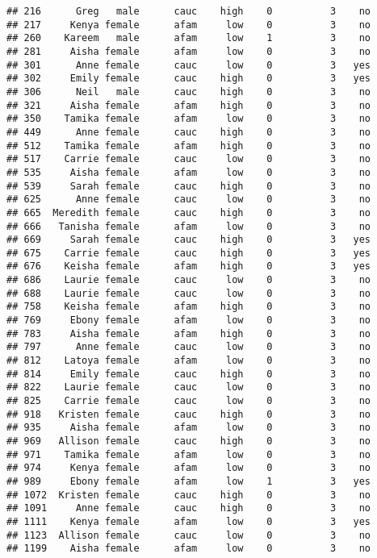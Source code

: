 \documentclass[
]{article}
\begin{document}
\begin{verbatim}
## 216      Greg   male      cauc    high    0          3    no
## 217     Kenya female      afam     low    0          3    no
## 260    Kareem   male      afam     low    1          3    no
## 281     Aisha female      afam     low    0          3    no
## 301      Anne female      cauc     low    0          3   yes
## 302     Emily female      cauc    high    0          3   yes
## 306      Neil   male      cauc    high    0          3    no
## 321     Aisha female      afam    high    0          3    no
## 350    Tamika female      afam     low    0          3    no
## 449      Anne female      cauc    high    0          3    no
## 512    Tamika female      afam    high    0          3    no
## 517    Carrie female      cauc     low    0          3    no
## 535     Aisha female      afam     low    0          3    no
## 539     Sarah female      cauc    high    0          3    no
## 625      Anne female      cauc     low    0          3    no
## 665  Meredith female      cauc    high    0          3    no
## 666   Tanisha female      afam     low    0          3    no
## 669     Sarah female      cauc    high    0          3   yes
## 675    Carrie female      cauc    high    0          3   yes
## 676    Keisha female      afam    high    0          3   yes
## 686    Laurie female      cauc     low    0          3    no
## 688    Laurie female      cauc     low    0          3    no
## 758    Keisha female      afam    high    0          3    no
## 769     Ebony female      afam     low    0          3    no
## 783     Aisha female      afam    high    0          3    no
## 797      Anne female      cauc     low    0          3    no
## 812    Latoya female      afam     low    0          3    no
## 814     Emily female      cauc    high    0          3    no
## 822    Laurie female      cauc     low    0          3    no
## 825    Carrie female      cauc     low    0          3    no
## 918   Kristen female      cauc    high    0          3    no
## 935     Aisha female      afam     low    0          3    no
## 969   Allison female      cauc    high    0          3    no
## 971    Tamika female      afam     low    0          3    no
## 974     Kenya female      afam     low    0          3    no
## 989     Ebony female      afam     low    1          3   yes
## 1072  Kristen female      cauc    high    0          3    no
## 1091     Anne female      cauc    high    0          3    no
## 1111    Kenya female      afam     low    0          3   yes
## 1123  Allison female      cauc     low    0          3    no
## 1199    Aisha female      afam     low    0          3    no

\end{verbatim}
\end{document}
